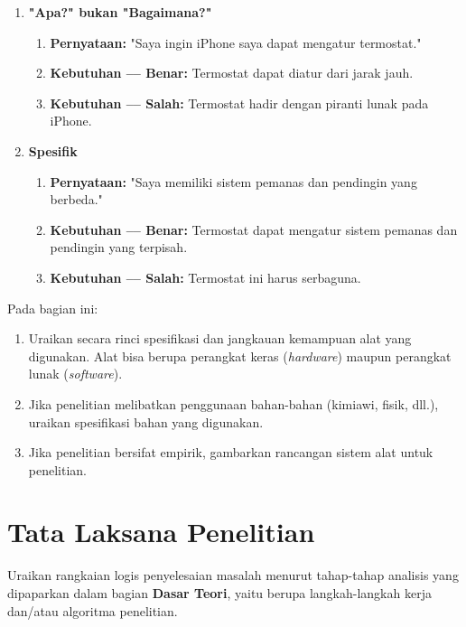 \begin{enumerate}
    \item \textbf{"Apa?" bukan "Bagaimana?"}
    \begin{enumerate}
        \item \textbf{Pernyataan:} "Saya ingin iPhone saya dapat mengatur termostat."
        \item \textbf{Kebutuhan –– Benar:} Termostat dapat diatur dari jarak jauh.
        \item \textbf{Kebutuhan –– Salah:} Termostat hadir dengan piranti lunak pada iPhone.
    \end{enumerate}
    \item \textbf{Spesifik}
    \begin{enumerate}
        \item \textbf{Pernyataan:} "Saya memiliki sistem pemanas dan pendingin yang berbeda."
        \item \textbf{Kebutuhan –– Benar:} Termostat dapat mengatur sistem pemanas dan pendingin yang terpisah.
        \item \textbf{Kebutuhan –– Salah:} Termostat ini harus serbaguna.
    \end{enumerate}
\end{enumerate}





Pada bagian ini:
\begin{enumerate}[label=\alph*)]
\item Uraikan secara rinci spesifikasi dan jangkauan kemampuan alat yang digunakan. Alat
bisa berupa perangkat keras (\textit{hardware}) maupun perangkat lunak (\textit{software}).
\item Jika penelitian melibatkan penggunaan bahan-bahan (kimiawi, fisik, dll.), uraikan
spesifikasi bahan yang digunakan.
\item Jika penelitian bersifat empirik, gambarkan rancangan sistem alat untuk penelitian.
\end{enumerate}



\section{Tata Laksana Penelitian}
 Uraikan rangkaian logis penyelesaian masalah menurut tahap-tahap
analisis yang dipaparkan dalam bagian \textbf{Dasar Teori}, yaitu berupa langkah-langkah
kerja dan/atau algoritma penelitian.


